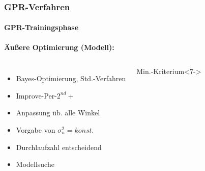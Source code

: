 \documentclass{beamer}
\begin{document}
\begin{frame}
\frametitle{GPR-Verfahren}
\framesubtitle{GPR-Trainingsphase}
\textbf{Äußere Optimierung (Modell):}
\begin{columns}[c]
	\begin{itemize}
		\item<2-> Bayes-Optimierung, Std.-Verfahren
		\item<2-> Improve-Per-$2^{nd}+$
		\item<3-> Anpassung üb. alle Winkel
		\item<4-> Vorgabe von $\sigma_n^2=konst.$
		\item<5-> Durchlaufzahl entscheidend
		\item<6-> Modellsuche
	\end{itemize}
	\begin{block}{Min.-Kriterium}<7->
	\end{block}


\end{columns}
\end{frame}
\end{document}

